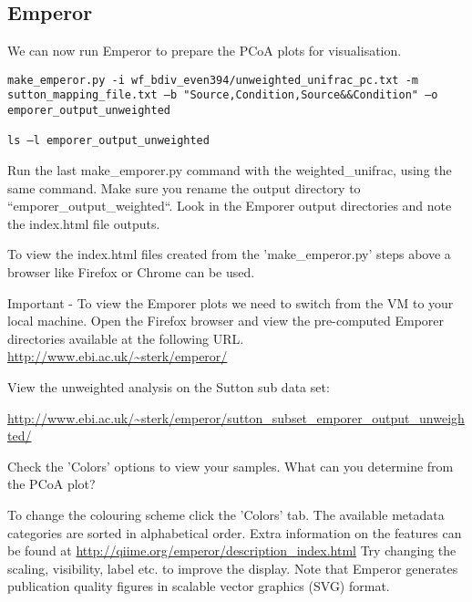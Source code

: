 \subsection{Emperor}
\begin{steps}
We can now run Emperor to prepare the PCoA plots for visualisation.

\begin{lstlisting}
make_emperor.py -i wf_bdiv_even394/unweighted_unifrac_pc.txt -m sutton_mapping_file.txt –b "Source,Condition,Source&&Condition" –o emporer_output_unweighted
 
ls –l emporer_output_unweighted
\end{lstlisting}
\end{steps}

\begin{steps}
Run the last make\_emporer.py command with the weighted\_unifrac, using the same command. Make sure you rename the output directory to “emporer\_output\_weighted“. Look in the Emporer output directories and note the index.html file outputs.
\end{steps}

To view the index.html files created from the 'make\_emperor.py' steps above a browser like Firefox or Chrome can be used. 

\begin{steps}
Important - To view the Emporer plots we need to switch from the VM to your local machine.
Open the Firefox browser and view the pre-computed Emporer directories available at the following URL. \url{http://www.ebi.ac.uk/~sterk/emperor/}
\end{steps}

View the unweighted analysis on the Sutton sub data set:
\begin{steps}
\url{http://www.ebi.ac.uk/~sterk/emperor/sutton_subset_emporer_output_unweighted/}
\end{steps}


\begin{questions}
Check the 'Colors' options to view your samples. 
What can you determine from the PCoA plot?
\begin{answer}

\end{answer}
\end{questions}

\begin{information}
To change the colouring scheme click the 'Colors' tab. The available metadata categories are sorted in alphabetical order. Extra information on the features can be found at \url{http://qiime.org/emperor/description_index.html}
Try changing the scaling, visibility, label etc. to improve the display.
Note that Emperor generates publication quality figures in scalable vector graphics (SVG) format.
\end{information}

